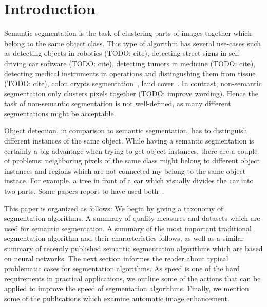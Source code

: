 \section{Introduction}\label{sec:introduction}
Semantic segmentation is the task of clustering parts of images together which
belong to the same object class. This type of algorithm has several use-cases
such as detecting objects in robotics (TODO: cite), detecting street signs in
self-driving car software (TODO: cite), detecting tumors in medicine (TODO:
cite), detecting medical instruments in operations and distingushing them from
tissue (TODO: cite), colon crypts segmentation~\cite{cohen2015memory}, land
cover~\cite{huang2002assessment}. In contrast, non-semantic segmentation only
clusters pixels together (TODO: improve wording). Hence the task of
non-semantic segmentation is not well-defined, as many different segmentations
might be acceptable.

Object detection, in comparison to semantic segmentation, has to distinguish
different instances of the same object. While having a semantic segmentation is
certainly a big advantage when trying to get object instances, there are a
couple of problems: neighboring pixels of the same class might belong to
different object instances and regions which are not connected my belong to the
same object instace. For example, a tree in front of a car which visually
divides the car into two parts. Some papers report to have used
both~\cite{tighe2014scene}.



This paper is organized as follows: We begin by giving a taxonomy of
segmentation algorithms. %
A summary of quality measures and datasets which are used for semantic
segmentation. A summary of the most important traditional segmentation
algorithm and their characteristics follows, as well as a similar summary of
recently published semantic segmentation algorithms which are based on neural
networks. The next section informes the reader about typical problematic cases
for segmentation algorithms. As speed is one of the hard requirements in
practical applications, we outline some of the actions that can be applied to
improve the speed of segmentation algorithms. Finally, we mention some of the
publications which examine automatic image enhancement.
